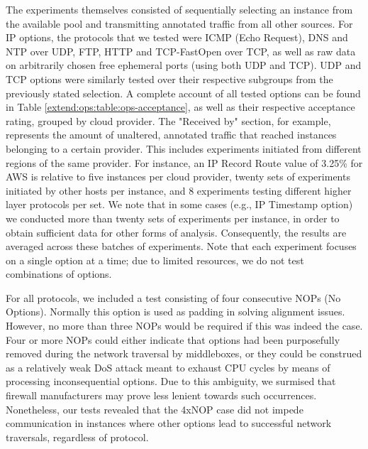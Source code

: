 The experiments themselves consisted of sequentially selecting an instance from the available pool and transmitting annotated traffic from all other sources. For IP options, the protocols that we tested were ICMP (Echo Request), DNS and NTP over UDP, FTP, HTTP and TCP-FastOpen over TCP, as well as raw data on arbitrarily chosen free ephemeral ports (using both UDP and TCP). UDP and TCP options were similarly tested over their respective subgroups from the previously stated selection. A complete account of all tested options can be found in Table \ref{extend:ops:table:ops-acceptance}, as well as their respective acceptance rating, grouped by cloud provider. The "Received by" section, for example, represents the amount of unaltered, annotated traffic that reached instances belonging to a certain provider. This includes experiments initiated from different regions of the same provider. For instance, an IP Record Route value of 3.25\% for AWS is relative to five instances per cloud provider, twenty sets of experiments initiated by other hosts per instance, and 8 experiments testing different higher layer protocols per set. We note that in some cases (e.g., IP Timestamp option) we conducted more than twenty sets of experiments per instance, in order to obtain sufficient data for other forms of analysis. Consequently, the results are averaged across these batches of experiments. Note that each experiment focuses on a single option at a time; due to limited resources, we do not test combinations of options.



For all protocols, we included a test consisting of four consecutive NOPs (No Options). Normally this option is used as padding in solving alignment issues. However, no more than three NOPs would be required if this was indeed the case. Four or more NOPs could either indicate that options had been purposefully removed during the network traversal by middleboxes, or they could be construed as a relatively weak DoS attack meant to exhaust CPU cycles by means of processing inconsequential options. Due to this ambiguity, we surmised that firewall manufacturers may prove less lenient towards such occurrences. Nonetheless, our tests revealed that the 4xNOP case did not impede communication in instances where other options lead to successful network traversals, regardless of protocol.

